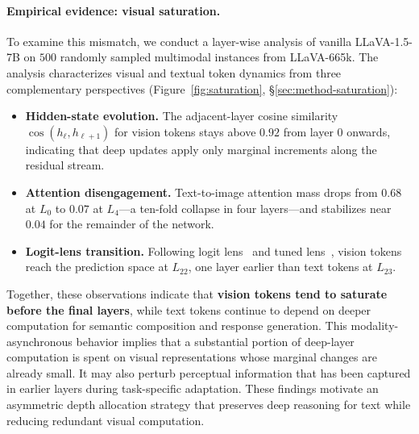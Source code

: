 \documentclass[a4paper,fleqn,review]{cas-sc}
\begin{document}
\paragraph{Empirical evidence: visual saturation.}
To examine this mismatch, we conduct a layer-wise analysis of vanilla
LLaVA-1.5-7B on $500$ randomly sampled multimodal instances from
LLaVA-665k. The analysis characterizes visual and textual token
dynamics from three complementary perspectives
(Figure~\ref{fig:saturation}, \S\ref{sec:method-saturation}):

\begin{itemize}
\item \textbf{Hidden-state evolution.} The adjacent-layer cosine
similarity $\cos(h_\ell, h_{\ell+1})$ for vision tokens stays above
$0.92$ from layer $0$ onwards, indicating that deep updates apply
only marginal increments along the residual stream.
\item \textbf{Attention disengagement.} Text-to-image attention mass
drops from $0.68$ at $L_0$ to $0.07$ at $L_4$---a ten-fold collapse
in four layers---and stabilizes near $0.04$ for the remainder of the
network.
\item \textbf{Logit-lens transition.} Following logit
lens~\citep{nostalgebraist2020logitlens} and tuned
lens~\citep{belrose2023tunedlens}, vision tokens reach the prediction
space at $L_{22}$, one layer earlier than text tokens at $L_{23}$.
\end{itemize}

Together, these observations indicate that \textbf{vision tokens tend
to saturate before the final layers}, while text tokens continue to
depend on deeper computation for semantic composition and response
generation. This modality-asynchronous behavior implies that a
substantial portion of deep-layer computation is spent on visual
representations whose marginal changes are already small. It may also
perturb perceptual information that has been captured in earlier
layers during task-specific adaptation. These findings motivate an
asymmetric depth allocation strategy that preserves deep reasoning
for text while reducing redundant visual computation.

\end{document}
